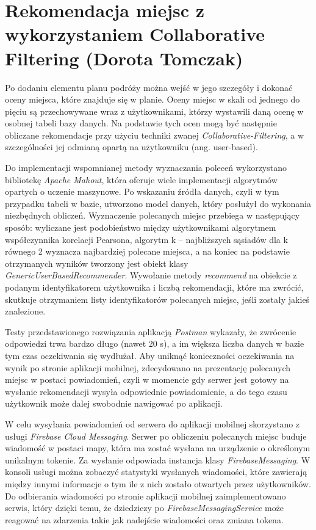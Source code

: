 \documentclass[10pt,twoside,a4paper]{report}
\begin{document}
\section{Rekomendacja miejsc z wykorzystaniem Collaborative Filtering (Dorota Tomczak)}
\par Po dodaniu elementu planu podróży można wejść w jego szczegóły i dokonać oceny miejsca, które znajduje się w planie. Oceny miejsc w skali od jednego do pięciu są przechowywane wraz z użytkownikami, którzy wystawili daną ocenę w osobnej tabeli bazy danych. Na podstawie tych ocen mogą być następnie obliczane rekomendacje przy użyciu techniki zwanej \textit{Collaborative-Filtering}, a w szczególności jej odmianą opartą na użytkowniku (ang. user-based).
\par Do implementacji wspomnianej metody wyznaczania poleceń wykorzystano bibliotekę \textit{Apache Mahout}\cite{Apache Mahout}, która oferuje wiele implementacji algorytmów opartych o uczenie maszynowe. Po wskazaniu źródła danych, czyli w tym przypadku tabeli w bazie, utworzono model danych, który posłużył do wykonania niezbędnych obliczeń. Wyznaczenie polecanych miejsc przebiega w następujący sposób: wyliczane jest podobieństwo między użytkownikami algorytmem współczynnika korelacji Pearsona, algorytm k – najbliższych sąsiadów dla k równego 2 wyznacza najbardziej polecane miejsca, a na koniec na podstawie otrzymanych wyników tworzony jest obiekt klasy \textit{GenericUserBasedRecommender}. Wywołanie metody \textit{recommend} na obiekcie z podanym identyfikatorem użytkownika i liczbą rekomendacji, które ma zwrócić, skutkuje otrzymaniem listy identyfikatorów polecanych miejsc, jeśli zostały jakieś znalezione.
\par Testy przedstawionego rozwiązania aplikacją \textit{Postman}\cite{Postman} wykazały, że zwrócenie odpowiedzi trwa bardzo długo (nawet 20 s), a im większa liczba danych w bazie tym czas oczekiwania się wydłużał. Aby uniknąć konieczności oczekiwania na wynik po stronie aplikacji mobilnej, zdecydowano na prezentację polecanych miejsc w postaci powiadomień, czyli w momencie gdy serwer jest gotowy na wysłanie rekomendacji wysyła odpowiednie powiadomienie, a do tego czasu użytkownik może dalej swobodnie nawigować po aplikacji.
\par W celu wysyłania powiadomień od serwera do aplikacji mobilnej skorzystano z usługi \textit{Firebase Cloud Messaging}\cite{Firebase}. Serwer po obliczeniu polecanych miejsc buduje wiadomość w postaci mapy, która ma zostać wysłana na urządzenie o określonym unikalnym tokenie. Za wysłanie odpowiada instancja klasy \textit{FirebaseMessaging}. W konsoli usługi można zobaczyć statystyki wysłanych wiadomości, które zawierają między innymi informacje o tym ile z nich zostało otwartych przez użytkowników. Do odbierania wiadomości po stronie aplikacji mobilnej zaimplementowano serwis, który dzięki temu, że dziedziczy po \textit{FirebaseMessagingService} może reagować na zdarzenia takie jak nadejście wiadomości oraz zmiana tokena.
\end{document}
